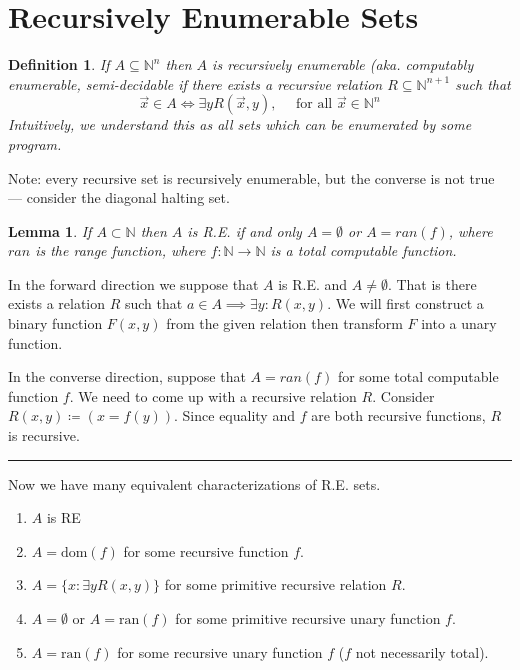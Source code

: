 \documentclass[twoside]{article}
\newtheorem{lemma}[theorem]{Lemma}
\newtheorem{definition}[theorem]{Definition}
\newenvironment{proof}{{\bf Proof:}}{\hfill\rule{2mm}{2mm}}
\def\N{\mathbb{N}}
\def\dom{\mbox{dom}}
\def\ran{\mbox{ran}}
\begin{document}
\section{Recursively Enumerable Sets}
\begin{definition}
If $A \subseteq \N^n$ then $A$ is \emph{recursively enumerable} (aka. computably enumerable, semi-decidable if there exists a recursive relation $R \subseteq \N^{n+1}$ such that 
\[\vec{x} \in A \iff \exists y R(\vec{x}, y), \quad \mbox{ for all } \vec{x} \in \N^{n}\]
Intuitively, we understand this as all sets which can be enumerated by some program.
\end{definition}

Note: every recursive set is recursively enumerable, but the converse is not true --- consider the diagonal halting set.

\begin{lemma}
If $A \subset \N$ then $A$ is R.E. if and only $A = \emptyset$ or $A = ran(f)$, where $ran$ is the range function, where $f: \N \rightarrow \N$ is a total computable function.
\end{lemma} 
\begin{proof}
In the forward direction we suppose that $A$ is R.E. and $A \neq \emptyset$. That is there exists a relation $R$ such that $a \in A \implies \exists y: R(x,y)$. We will first construct a binary function $F(x,y)$ from the given relation then transform $F$ into a unary function. 

In the converse direction, suppose that $A = ran(f)$ for some total computable function $f$. We need to come up with a recursive relation $R$. Consider $R(x,y) \coloneqq (x = f(y))$. Since equality and $f$ are both recursive functions, $R$ is recursive.  
\end{proof}

Now we have many equivalent characterizations of R.E. sets. 
\begin{enumerate}
\item $A$ is RE
\item $A = \dom(f)$ for some recursive function $f$.
\item $A = \{x: \exists y R(x,y)\}$ for some primitive recursive relation $R$.
\item $A = \emptyset$ or $A = \ran(f)$ for some primitive recursive unary function $f$.
\item $A = \ran(f)$ for some recursive unary function $f$ ($f$ not necessarily total).
\end{enumerate}
\end{document}
